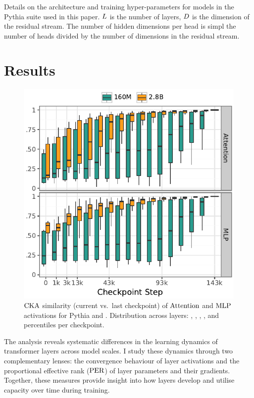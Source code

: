 \begin{table}[!t]
    \centering
    
    \caption{Details on the architecture and training hyper-parameters for models in the Pythia suite used in this paper. $L$ is the number of layers, $D$ is the dimension of the residual stream. The number of hidden dimensions per head is simpl the number of heads divided by the number of dimensions in the residual stream.}
    \label{tab:model_hparams}
\end{table}


\section{Results}
\label{sec:tending-towards-stability-results}

\begin{figure}
    \vspace{-36pt}
    \centering
    \includegraphics[width=0.54\columnwidth]{chapters/tending-towards-stability/figures/cka_main_plot.pdf}
    \caption{$\mathrm{CKA}$ similarity (current vs.\ last checkpoint) of $\mathrm{Attention}$ and $\mathrm{MLP}$ activations for Pythia \sixmil and \twobil. Distribution across layers: , , , , and  percentiles per checkpoint.}
    \label{fig:cka_main_plot}
\end{figure}

The analysis reveals systematic differences in the learning dynamics of transformer layers across model scales. I study these dynamics through two complementary lenses: the convergence behaviour of layer activations and the proportional effective rank ($\mathrm{PER}$) of layer parameters and their gradients. Together, these measures provide insight into how layers develop and utilise capacity over time during training.

